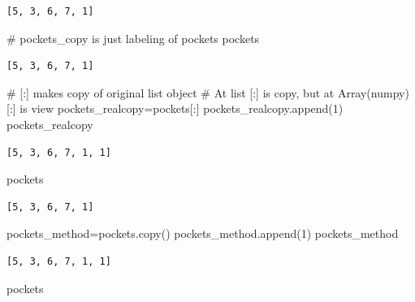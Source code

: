 \documentclass[
  letterpaper,
  DIV=11,
  numbers=noendperiod]{scrreprt}
\newenvironment{Shaded}{\begin{snugshade}}{\end{snugshade}}
\newcommand{\CommentTok}[1]{\textcolor[rgb]{0.37,0.37,0.37}{#1}}
\newcommand{\DecValTok}[1]{\textcolor[rgb]{0.68,0.00,0.00}{#1}}
\newcommand{\NormalTok}[1]{\textcolor[rgb]{0.00,0.23,0.31}{#1}}
\newcommand{\OperatorTok}[1]{\textcolor[rgb]{0.37,0.37,0.37}{#1}}
\begin{document}
\begin{verbatim}
[5, 3, 6, 7, 1]
\end{verbatim}

\begin{Shaded}
\begin{Highlighting}[]
\CommentTok{\# pockets\_copy is just labeling of pockets}
\NormalTok{pockets}
\end{Highlighting}
\end{Shaded}

\begin{verbatim}
[5, 3, 6, 7, 1]
\end{verbatim}

\begin{Shaded}
\begin{Highlighting}[]
\CommentTok{\# [:] makes copy of original list object}
\CommentTok{\# At list [:] is copy, but at Array(numpy) [:] is view}
\NormalTok{pockets\_realcopy}\OperatorTok{=}\NormalTok{pockets[:]}
\NormalTok{pockets\_realcopy.append(}\DecValTok{1}\NormalTok{)}
\NormalTok{pockets\_realcopy}
\end{Highlighting}
\end{Shaded}

\begin{verbatim}
[5, 3, 6, 7, 1, 1]
\end{verbatim}

\begin{Shaded}
\begin{Highlighting}[]
\NormalTok{pockets}
\end{Highlighting}
\end{Shaded}

\begin{verbatim}
[5, 3, 6, 7, 1]
\end{verbatim}

\begin{Shaded}
\begin{Highlighting}[]
\NormalTok{pockets\_method}\OperatorTok{=}\NormalTok{pockets.copy()}
\NormalTok{pockets\_method.append(}\DecValTok{1}\NormalTok{)}
\NormalTok{pockets\_method}
\end{Highlighting}
\end{Shaded}

\begin{verbatim}
[5, 3, 6, 7, 1, 1]
\end{verbatim}

\begin{Shaded}
\begin{Highlighting}[]
\NormalTok{pockets}
\end{Highlighting}
\end{Shaded}
\end{document}
